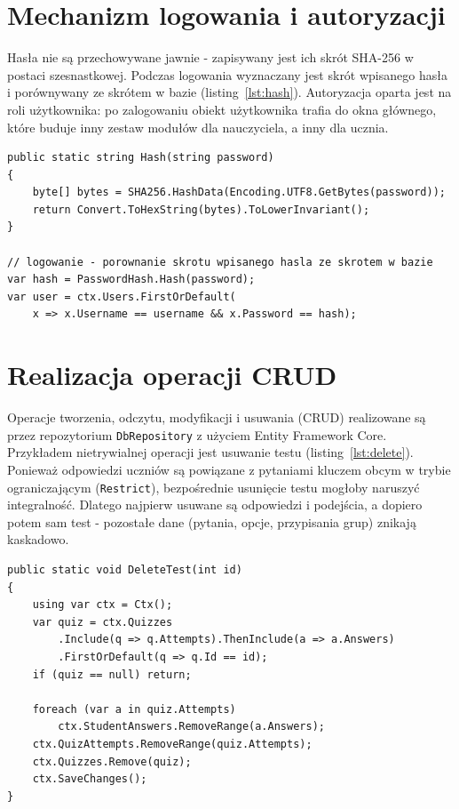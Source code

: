 
\section{Mechanizm logowania i autoryzacji}
\label{sec:logowanie}

Hasła nie są przechowywane jawnie - zapisywany jest ich skrót SHA-256 w postaci szesnastkowej.
Podczas logowania wyznaczany jest skrót wpisanego hasła i porównywany ze skrótem w bazie
(listing~\ref{lst:hash}). Autoryzacja oparta jest na roli użytkownika: po zalogowaniu obiekt
użytkownika trafia do okna głównego, które buduje inny zestaw modułów dla nauczyciela, a inny dla
ucznia.

\begin{lstlisting}[caption={Haszowanie hasła i logowanie.}, label=lst:hash]
public static string Hash(string password)
{
    byte[] bytes = SHA256.HashData(Encoding.UTF8.GetBytes(password));
    return Convert.ToHexString(bytes).ToLowerInvariant();
}

// logowanie - porownanie skrotu wpisanego hasla ze skrotem w bazie
var hash = PasswordHash.Hash(password);
var user = ctx.Users.FirstOrDefault(
    x => x.Username == username && x.Password == hash);
\end{lstlisting}

\section{Realizacja operacji CRUD}
\label{sec:crud}

Operacje tworzenia, odczytu, modyfikacji i usuwania (CRUD) realizowane są przez repozytorium
\texttt{DbRepository} z użyciem Entity Framework Core. Przykładem nietrywialnej operacji jest
usuwanie testu (listing~\ref{lst:delete}). Ponieważ odpowiedzi uczniów są powiązane z pytaniami
kluczem obcym w trybie ograniczającym (\texttt{Restrict}), bezpośrednie usunięcie testu mogłoby
naruszyć integralność. Dlatego najpierw usuwane są odpowiedzi i podejścia, a dopiero potem sam test -
pozostałe dane (pytania, opcje, przypisania grup) znikają kaskadowo.

\begin{lstlisting}[caption={Bezpieczne usuwanie testu (zachowanie integralności).}, label=lst:delete]
public static void DeleteTest(int id)
{
    using var ctx = Ctx();
    var quiz = ctx.Quizzes
        .Include(q => q.Attempts).ThenInclude(a => a.Answers)
        .FirstOrDefault(q => q.Id == id);
    if (quiz == null) return;

    foreach (var a in quiz.Attempts)
        ctx.StudentAnswers.RemoveRange(a.Answers);
    ctx.QuizAttempts.RemoveRange(quiz.Attempts);
    ctx.Quizzes.Remove(quiz);
    ctx.SaveChanges();
}
\end{lstlisting}


